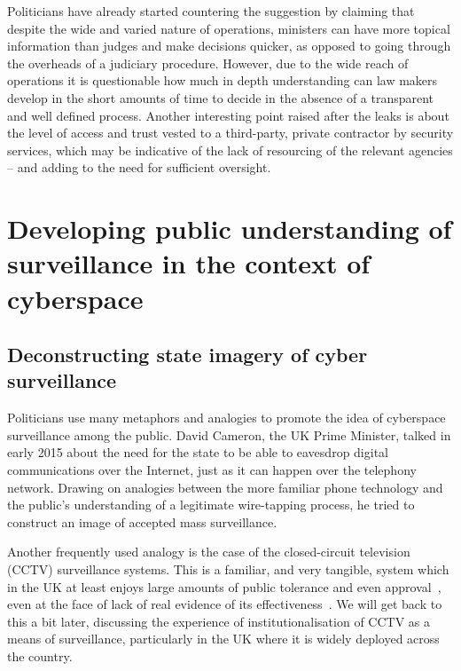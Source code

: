 \documentclass{llncs}
\begin{document}
Politicians have already started countering the suggestion by claiming that despite the wide and varied nature of operations, ministers can have more topical information than judges and make decisions quicker, as opposed to going through the overheads of a judiciary procedure. However, due to the wide reach of operations it is questionable how much in depth understanding can law makers develop in the short amounts of time to decide in the absence of a transparent and well defined process. Another interesting point raised after the leaks is about the level of access and trust vested to a third-party, private contractor by security services, which may be indicative of the lack of resourcing of the relevant agencies -- and adding to the need for sufficient oversight.

\section{Developing public understanding of surveillance in the context of cyberspace}
\label{sec:Understanding}
\subsection{Deconstructing state imagery of cyber surveillance}
Politicians use many metaphors and analogies to promote the idea of cyberspace surveillance among the public. David Cameron, the UK Prime Minister, talked in early 2015 about the need for the state to be able to eavesdrop digital communications over the Internet, just as it can happen over the telephony network. Drawing on analogies between the more familiar phone technology and the public's understanding of a legitimate wire-tapping process, he tried to construct an image of accepted mass surveillance.

Another frequently used analogy is the case of the closed-circuit television (CCTV) surveillance systems. This is a familiar, and very tangible, system which in the UK at least enjoys large amounts of public tolerance and even approval~\cite{Ditton}, even at the face of lack of real evidence of its effectiveness~\cite{Woodhouse}. We will get back to this a bit later, discussing the experience of institutionalisation of CCTV as a means of surveillance, particularly in the UK where it is widely deployed across the country.
\end{document}
